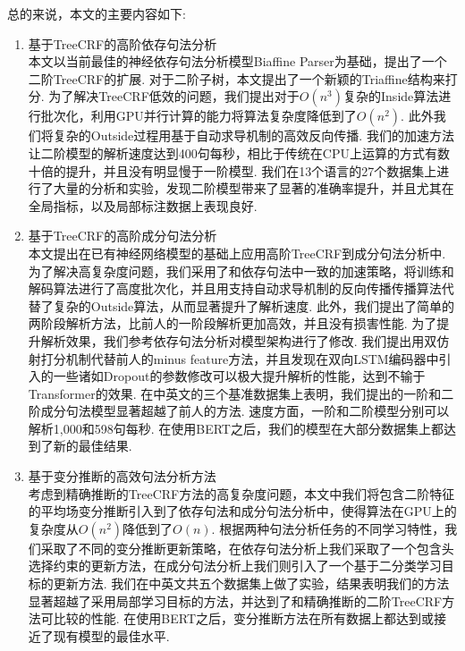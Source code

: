 总的来说，本文的主要内容如下:
\begin{enumerate}
  \item 基于TreeCRF的高阶依存句法分析\\
        \indent 本文以当前最佳的神经依存句法分析模型Biaffine Parser为基础，提出了一个二阶TreeCRF的扩展.
        对于二阶子树，本文提出了一个新颖的Triaffine结构来打分.
        为了解决TreeCRF低效的问题，我们提出对于$O(n^3)$复杂的Inside算法进行批次化，利用GPU并行计算的能力将算法复杂度降低到了$O(n^2)$.
        此外我们将复杂的Outside过程用基于自动求导机制的高效反向传播.
        我们的加速方法让二阶模型的解析速度达到400句每秒，相比于传统在CPU上运算的方式有数十倍的提升，并且没有明显慢于一阶模型.
        我们在13个语言的27个数据集上进行了大量的分析和实验，发现二阶模型带来了显著的准确率提升，并且尤其在全局指标，以及局部标注数据上表现良好.
  \item 基于TreeCRF的高阶成分句法分析\\
        \indent 本文提出在已有神经网络模型的基础上应用高阶TreeCRF到成分句法分析中.
        为了解决高复杂度问题，我们采用了和依存句法中一致的加速策略，将训练和解码算法进行了高度批次化，并且用支持自动求导机制的反向传播传播算法代替了复杂的Outside算法，从而显著提升了解析速度.
        此外，我们提出了简单的两阶段解析方法，比前人的一阶段解析更加高效，并且没有损害性能.
        为了提升解析效果，我们参考依存句法分析对模型架构进行了修改.
        我们提出用双仿射打分机制代替前人的minus feature方法，并且发现在双向LSTM编码器中引入的一些诸如Dropout的参数修改可以极大提升解析的性能，达到不输于Transformer的效果.
        在中英文的三个基准数据集上表明，我们提出的一阶和二阶成分句法模型显著超越了前人的方法.
        速度方面，一阶和二阶模型分别可以解析1,000和598句每秒.
        在使用BERT之后，我们的模型在大部分数据集上都达到了新的最佳结果.
  \item 基于变分推断的高效句法分析方法\\
        \indent 考虑到精确推断的TreeCRF方法的高复杂度问题，本文中我们将包含二阶特征的平均场变分推断引入到了依存句法和成分句法分析中，使得算法在GPU上的复杂度从$O(n^2)$降低到了$O(n)$.
        根据两种句法分析任务的不同学习特性，我们采取了不同的变分推断更新策略，在依存句法分析上我们采取了一个包含头选择约束的更新方法，在成分句法分析上我们则引入了一个基于二分类学习目标的更新方法.
        我们在中英文共五个数据集上做了实验，结果表明我们的方法显著超越了采用局部学习目标的方法，并达到了和精确推断的二阶TreeCRF方法可比较的性能.
        在使用BERT之后，变分推断方法在所有数据上都达到或接近了现有模型的最佳水平.
\end{enumerate}

